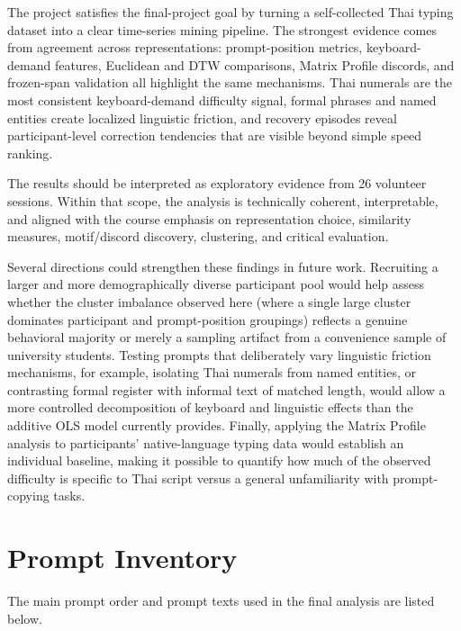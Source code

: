 \documentclass[11pt,a4paper]{article}
\begin{document}
The project satisfies the final-project goal by turning a self-collected Thai typing dataset into a clear time-series mining pipeline. The strongest evidence comes from agreement across representations: prompt-position metrics, keyboard-demand features, Euclidean and DTW comparisons, Matrix Profile discords, and frozen-span validation all highlight the same mechanisms. Thai numerals are the most consistent keyboard-demand difficulty signal, formal phrases and named entities create localized linguistic friction, and recovery episodes reveal participant-level correction tendencies that are visible beyond simple speed ranking.

The results should be interpreted as exploratory evidence from 26 volunteer sessions. Within that scope, the analysis is technically coherent, interpretable, and aligned with the course emphasis on representation choice, similarity measures, motif/discord discovery, clustering, and critical evaluation.

Several directions could strengthen these findings in future work. Recruiting a larger and more demographically diverse participant pool would help assess whether the cluster imbalance observed here (where a single large cluster dominates participant and prompt-position groupings) reflects a genuine behavioral majority or merely a sampling artifact from a convenience sample of university students. Testing prompts that deliberately vary linguistic friction mechanisms, for example, isolating Thai numerals from named entities, or contrasting formal register with informal text of matched length, would allow a more controlled decomposition of keyboard and linguistic effects than the additive OLS model currently provides. Finally, applying the Matrix Profile analysis to participants' native-language typing data would establish an individual baseline, making it possible to quantify how much of the observed difficulty is specific to Thai script versus a general unfamiliarity with prompt-copying tasks.

\appendix
\clearpage

\section{Prompt Inventory}

The main prompt order and prompt texts used in the final analysis are listed below.
\end{document}
